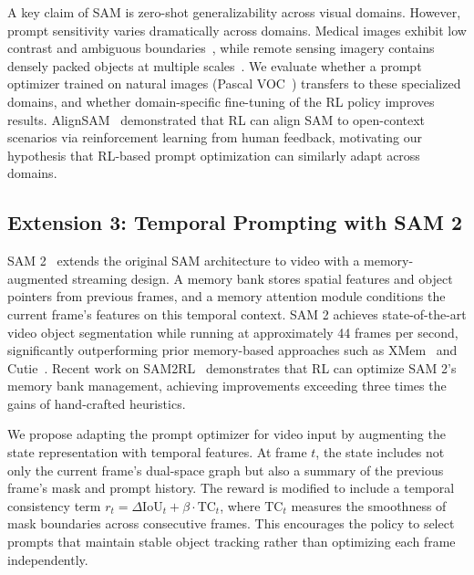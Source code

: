 \documentclass[journal, onecolumn]{IEEEtran}
\begin{document}
A key claim of SAM is zero-shot generalizability across visual domains. However, prompt sensitivity varies dramatically across domains. Medical images exhibit low contrast and ambiguous boundaries~\cite{Zhang2024MedSAM}, while remote sensing imagery contains densely packed objects at multiple scales~\cite{Osco2023SAMRemoteSensing}. We evaluate whether a prompt optimizer trained on natural images (Pascal VOC~\cite{Everingham2010VOC}) transfers to these specialized domains, and whether domain-specific fine-tuning of the RL policy improves results. AlignSAM~\cite{Huang2024AlignSAM} demonstrated that RL can align SAM to open-context scenarios via reinforcement learning from human feedback, motivating our hypothesis that RL-based prompt optimization can similarly adapt across domains.

\subsection{Extension 3: Temporal Prompting with SAM 2}

SAM 2~\cite{Ravi2024SAM2} extends the original SAM architecture to video with a memory-augmented streaming design. A memory bank stores spatial features and object pointers from previous frames, and a memory attention module conditions the current frame's features on this temporal context. SAM 2 achieves state-of-the-art video object segmentation while running at approximately 44 frames per second, significantly outperforming prior memory-based approaches such as XMem~\cite{Cheng2024XMem} and Cutie~\cite{Cheng2024Cutie}. Recent work on SAM2RL~\cite{Yang2025SAM2RL} demonstrates that RL can optimize SAM 2's memory bank management, achieving improvements exceeding three times the gains of hand-crafted heuristics.

We propose adapting the prompt optimizer for video input by augmenting the state representation with temporal features. At frame $t$, the state includes not only the current frame's dual-space graph but also a summary of the previous frame's mask and prompt history. The reward is modified to include a temporal consistency term $r_t = \Delta\text{IoU}_t + \beta \cdot \text{TC}_t$, where $\text{TC}_t$ measures the smoothness of mask boundaries across consecutive frames. This encourages the policy to select prompts that maintain stable object tracking rather than optimizing each frame independently.
\end{document}
